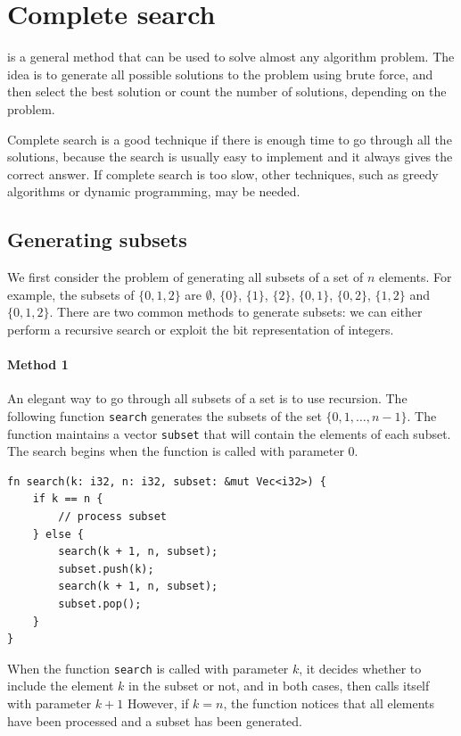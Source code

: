 \chapter{Complete search}

is a general method that can be used
to solve almost any algorithm problem.
The idea is to generate all possible
solutions to the problem using brute force,
and then select the best solution or count the
number of solutions, depending on the problem.

Complete search is a good technique
if there is enough time to go through all the solutions,
because the search is usually easy to implement
and it always gives the correct answer.
If complete search is too slow,
other techniques, such as greedy algorithms or
dynamic programming, may be needed.

\section{Generating subsets}


We first consider the problem of generating
all subsets of a set of $n$ elements.
For example, the subsets of $\{0,1,2\}$ are
$\emptyset$, $\{0\}$, $\{1\}$, $\{2\}$, $\{0,1\}$,
$\{0,2\}$, $\{1,2\}$ and $\{0,1,2\}$.
There are two common methods to generate subsets:
we can either perform a recursive search
or exploit the bit representation of integers.

\subsubsection{Method 1}

An elegant way to go through all subsets
of a set is to use recursion.
The following function \texttt{search}
generates the subsets of the set
$\{0,1,\ldots,n-1\}$.
The function maintains a vector \texttt{subset}
that will contain the elements of each subset.
The search begins when the function is called
with parameter 0.

\begin{lstlisting}
fn search(k: i32, n: i32, subset: &mut Vec<i32>) {
    if k == n {
        // process subset
    } else {
        search(k + 1, n, subset);
        subset.push(k);
        search(k + 1, n, subset);
        subset.pop();
    }
}
\end{lstlisting}

When the function \texttt{search}
is called with parameter $k$,
it decides whether to include the
element $k$ in the subset or not,
and in both cases,
then calls itself with parameter $k+1$
However, if $k=n$, the function notices that
all elements have been processed
and a subset has been generated.

